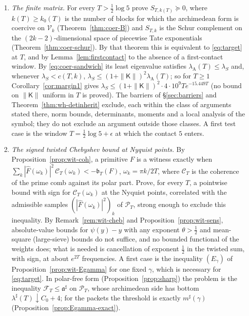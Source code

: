 \documentclass[11pt]{amsart}
\theoremstyle{definition}
\theoremstyle{remark}
\newcommand{\PT}{\mathcal P_T}
\newcommand{\lamA}{\lambda_{\mathrm A}(T)}
\newcommand{\Fh}{\widehat F}
\begin{document}
\begin{enumerate}
\item[(L2)] \emph{The finite matrix.} For every $T>\frac12\log5$ prove $S_{T,k(T)}\succeq0$, where $k(T)\ge k_0(T)$ is
the number of blocks for which the archimedean form is coercive on $\mathcal V_k$ (Theorem~\ref{thm:coer-B}) and
$S_{T,k}$ is the Schur complement on the $(2k-2)$-dimensional space of piecewise Tate exponentials
(Theorem~\ref{thm:coer-schur}). By that theorem this is equivalent to \eqref{eq:target} at $T$, and by
Lemma~\ref{lem:firstcontact} to the absence of a first-contact window. By \eqref{eq:coer-sandwich} its least
eigenvalue satisfies $\lamA\le\lambda_S$ and, whenever $\lambda_S<c(T,k)$, $\lambda_S\le(1+\|\mathsf K\|)^2\lamA$; so for
$T\ge1$ Corollary~\ref{cor:margin1} gives $\lambda_S\le(1+\|\mathsf K\|)^2\cdot4\cdot10^9Te^{-15.449T}$ (no bound on
$\|\mathsf K\|$ uniform in $T$ is proved). The barriers of \S\ref{sec:barriers} and
Theorem~\ref{thm:wh-detinherit} exclude, each within the class of arguments stated there, norm bounds,
determinants, moments and a local analysis of the symbol; they do not exclude an argument outside those
classes. A first test case is
the window $T=\frac12\log5+\epsilon$ at which the contact $5$ enters.
\item[(N)] \emph{The signed twisted Chebyshev bound at Nyquist points.} By Proposition~\ref{prop:wit-coh}, a
primitive $F$ is a witness exactly when $\sum_k|\Fh(\omega_k)|^2\,\mathcal C_T(\omega_k)<-\mathfrak b_T(F)$,
$\omega_k=\pi k/2T$, where $\mathcal C_T$ is the coherence of the prime comb against its polar part. Prove, for
every $T$, a pointwise bound with sign for $\mathcal C_T(\omega_k)$ at the Nyquist points, correlated with the
admissible samples $(|\Fh(\omega_k)|^2)_k$ of $\PT$, strong enough to exclude this inequality. By
Remark~\ref{rem:wit-cheb} and Proposition~\ref{prop:wit-sens}, absolute-value bounds for $\psi(y)-y$ with any
exponent $\theta>\frac12$ and mean-square (large-sieve) bounds do not suffice, and no bounded functional of the
weights does; what is needed is cancellation of exponent $\frac12$ in the twisted sum, with sign, at about
$e^{2T}$ frequencies. A first case is the inequality $(E_\gamma)$ of Proposition~\ref{prop:wit-Egamma} for one fixed
$\gamma$, which is necessary for \eqref{eq:target}. In polar-free form (Proposition~\ref{prop:sharp}) the problem is the
inequality $\mathcal F_T\le\mathfrak a^\sharp$ on $\PT$, whose archimedean side has bottom $\lambda^\sharp(T)\downarrow C_0+4$; for the
packets the threshold is exactly $m^\sharp(\gamma)$ (Proposition~\ref{prop:Egamma-exact}).

\end{enumerate}
\end{document}
